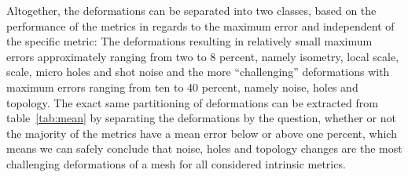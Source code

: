 Altogether, the deformations can be separated into two classes, based on the performance of the metrics in regards to the  maximum error and independent of the specific metric:
The deformations resulting in relatively small maximum errors approximately ranging from two to 8 percent, namely isometry, local scale, scale, micro holes and shot noise and the more ``challenging'' deformations with maximum errors ranging from ten to 40 percent, namely noise, holes and topology.
The exact same partitioning of deformations can be extracted from table~\ref{tab:mean} by separating the deformations by the question, whether or not the majority of the metrics have a mean error below or above one percent, which means we can safely conclude that noise, holes and topology changes are the most challenging deformations of a mesh for all considered intrinsic metrics.
